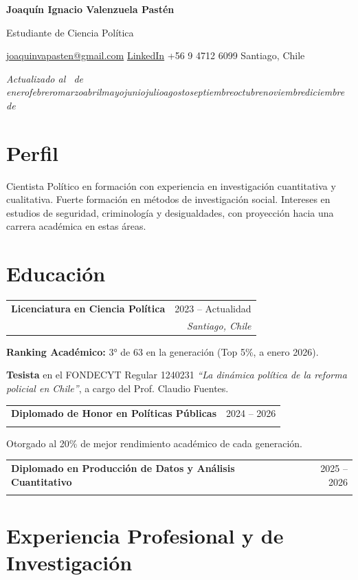 \documentclass[a4paper,10pt]{article}
\makeatletter
\newcommand{\experience}[5]{%
    \par\noindent\begin{minipage}{\linewidth}%
        \renewcommand{\arraystretch}{0.92}%
        \begin{tabularx}{\linewidth}{@{}>{\raggedright\arraybackslash}X@{\hspace{1em}}r@{}}%
            \textbf{#1} & {#2}\\
            {\itshape #3} & {\itshape #4}%
        \end{tabularx}\par
        #5%
    \end{minipage}\par\addvspace{2pt}%
}
\newcommand{\hoyenespanol}{\number\day\ de \ifcase\month\or enero\or febrero\or marzo\or abril\or mayo\or junio\or julio\or agosto\or septiembre\or octubre\or noviembre\or diciembre\fi\ de \number\year}
\makeatother
\begin{document}
\pagestyle{empty}
\fontsize{11}{12}\selectfont

\begingroup
\centering
{\color{cvGranate}\fontsize{19}{21}\selectfont\bfseries Joaquín Ignacio Valenzuela Pastén\par}
\vspace{2pt}
{\normalsize Estudiante de Ciencia Política\par}
\vspace{2pt}
\href{mailto:joaquinvapasten@gmail.com}{joaquinvapasten@gmail.com} \enspace\textperiodcentered\enspace
\href{https://www.linkedin.com/in/joaqu%C3%ADn-valenzuela-past%C3%A9n-66ba12273/}{LinkedIn} \enspace\textperiodcentered\enspace
+56 9 4712 6099 \enspace\textperiodcentered\enspace Santiago, Chile\par
\vspace{2pt}
{\small\itshape Actualizado al \hoyenespanol\par}
\endgroup

\section*{Perfil}
Cientista Político en formación con experiencia en investigación cuantitativa y cualitativa. Fuerte formación en métodos de investigación social. Intereses en estudios de seguridad, criminología y desigualdades, con proyección hacia una carrera académica en estas áreas.
\section*{Educación}

\experience{Licenciatura en Ciencia Política}{2023 -- Actualidad}{Universidad Diego Portales}{Santiago, Chile}{
    \textbf{Ranking Académico:} 3° de 63 en la generación (Top 5\%, a enero 2026).\par
    \textbf{Tesista} en el FONDECYT Regular 1240231 \textit{``La dinámica política de la reforma policial en Chile''}, a cargo del Prof. Claudio Fuentes.
}

\experience{Diplomado de Honor en Políticas Públicas}{2024 -- 2026}{Universidad Diego Portales}{}{
    Otorgado al 20\% de mejor rendimiento académico de cada generación.
}

\experience{Diplomado en Producción de Datos y Análisis Cuantitativo}{2025 -- 2026}{Facultad de Ciencias Sociales y Humanidades, Universidad Diego Portales}{}{}

\section*{Experiencia Profesional y de Investigación}
\end{document}
